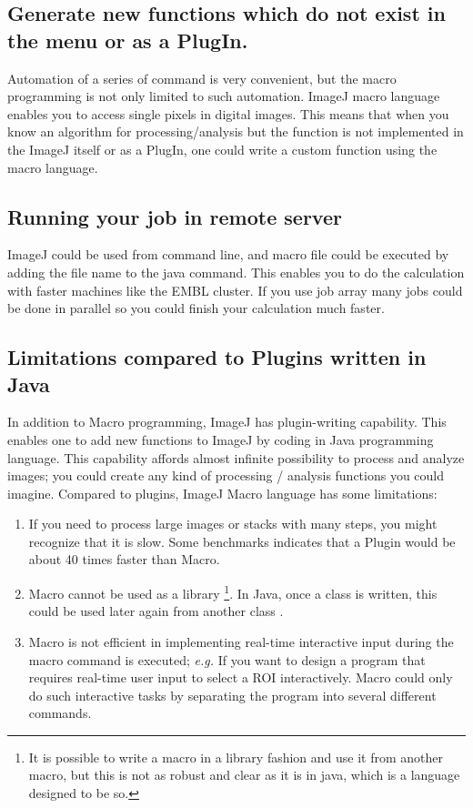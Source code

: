 \documentclass[11pt,a4paper,oneside]{report}
\begin{document}
\subsection{Generate new functions which do not exist in the menu or as a PlugIn.}
Automation of a series of command is very convenient, 
but the macro programming is not only limited to such automation. 
ImageJ macro language enables you to access single pixels in digital images. 
This means that when you know an algorithm for processing/analysis 
but the function is not implemented in the ImageJ 
itself or as a PlugIn, one could write a custom function using the macro language.
\subsection{Running your job in remote server}
ImageJ could be used from command line, and macro file could be executed by 
adding the file name to the java command. 
This enables you to do the calculation with faster machines like the EMBL cluster. 
If you use job array many jobs could be done in parallel so you could finish your calculation much faster.

\subsection{Limitations compared to Plugins written in Java}

In addition to Macro programming, ImageJ has plugin-writing capability. 
This enables one to add new functions to ImageJ by coding in Java programming language. 
This capability affords almost infinite possibility to process and analyze images; 
you could create any kind of processing / analysis functions you could imagine. 
Compared to plugins, ImageJ Macro language has some limitations: 

\begin{enumerate}
\item If you need to process large images or stacks with many steps, 
you might recognize that it is slow. 
Some benchmarks indicates that a Plugin would be about 40 times faster than Macro. 

\item Macro cannot be used as a library
\footnote{It is possible to write a macro in a library fashion and use it from another macro, 
but this is not as robust and clear as it is in java, which is a language designed to be so.}. 
In Java, once a class is written, this could be used later again from another class . 

\item Macro is not efficient in implementing real-time interactive input 
during the macro command is executed; 
\textit{e.g.} If you want to design a program that requires real-time user input 
to select a ROI interactively.  
Macro could only do such interactive tasks by separating the program into several different commands. 
\end{enumerate}
\end{document}
